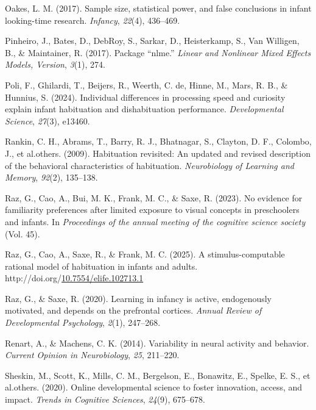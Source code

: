 \documentclass[10pt, letterpaper]{article}
\newenvironment{CSLReferences}%
  {}%
  {\par}
\begin{document}
\begin{CSLReferences}{1}{0}
\leavevmode{}%
Oakes, L. M. (2017). Sample size, statistical power, and false
conclusions in infant looking-time research. \emph{Infancy},
\emph{22}(4), 436--469.

\leavevmode{}%
Pinheiro, J., Bates, D., DebRoy, S., Sarkar, D., Heisterkamp, S., Van
Willigen, B., \& Maintainer, R. (2017). Package {``nlme.''} \emph{Linear
and Nonlinear Mixed Effects Models, Version}, \emph{3}(1), 274.

\leavevmode{}%
Poli, F., Ghilardi, T., Beijers, R., Weerth, C. de, Hinne, M., Mars, R.
B., \& Hunnius, S. (2024). Individual differences in processing speed
and curiosity explain infant habituation and dishabituation performance.
\emph{Developmental Science}, \emph{27}(3), e13460.

\leavevmode{}%
Rankin, C. H., Abrams, T., Barry, R. J., Bhatnagar, S., Clayton, D. F.,
Colombo, J., et al.others. (2009). Habituation revisited: An updated and
revised description of the behavioral characteristics of habituation.
\emph{Neurobiology of Learning and Memory}, \emph{92}(2), 135--138.

\leavevmode{}%
Raz, G., Cao, A., Bui, M. K., Frank, M. C., \& Saxe, R. (2023). No
evidence for familiarity preferences after limited exposure to visual
concepts in preschoolers and infants. In \emph{Proceedings of the annual
meeting of the cognitive science society} (Vol. 45).

\leavevmode{}%
Raz, G., Cao, A., Saxe, R., \& Frank, M. C. (2025). A
stimulus-computable rational model of habituation in infants and adults.
http://doi.org/\href{https://doi.org/10.7554/elife.102713.1}{10.7554/elife.102713.1}

\leavevmode{}%
Raz, G., \& Saxe, R. (2020). Learning in infancy is active, endogenously
motivated, and depends on the prefrontal cortices. \emph{Annual Review
of Developmental Psychology}, \emph{2}(1), 247--268.

\leavevmode{}%
Renart, A., \& Machens, C. K. (2014). Variability in neural activity and
behavior. \emph{Current Opinion in Neurobiology}, \emph{25}, 211--220.

\leavevmode{}%
Sheskin, M., Scott, K., Mills, C. M., Bergelson, E., Bonawitz, E.,
Spelke, E. S., et al.others. (2020). Online developmental science to
foster innovation, access, and impact. \emph{Trends in Cognitive
Sciences}, \emph{24}(9), 675--678.


\end{CSLReferences}
\end{document}
